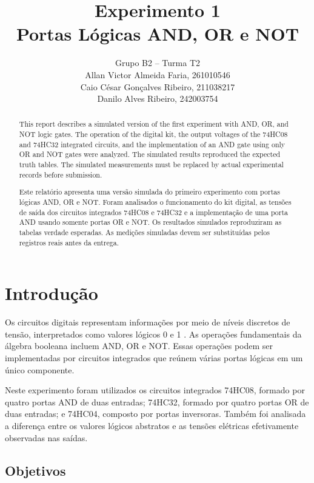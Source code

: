\documentclass[12pt]{article}
\title{Experimento 1\\
Portas Lógicas AND, OR e NOT}
\author{Grupo B2 -- Turma T2\\
        Allan Victor Almeida Faria, 261010546\\
        Caio César Gonçalves Ribeiro, 211038217\\
        Danilo Alves Ribeiro, 242003754}
\newenvironment{resumo}
        {\renewcommand{\abstractname}{Resumo}\begin{abstract}}
        {\end{abstract}}
\begin{document}
\maketitle

\renewcommand{\abstractname}{Abstract}
\begin{abstract}
This report describes a simulated version of the first experiment with AND,
OR, and NOT logic gates. The operation of the digital kit, the output voltages
of the 74HC08 and 74HC32 integrated circuits, and the implementation of an AND
gate using only OR and NOT gates were analyzed. The simulated results reproduced
the expected truth tables. The simulated measurements must be replaced by actual
experimental records before submission.
\end{abstract}

\begin{resumo}
Este relatório apresenta uma versão simulada do primeiro experimento com portas
lógicas AND, OR e NOT. Foram analisados o funcionamento do kit digital, as
tensões de saída dos circuitos integrados 74HC08 e 74HC32 e a implementação de
uma porta AND usando somente portas OR e NOT. Os resultados simulados reproduziram
as tabelas verdade esperadas. As medições simuladas devem ser substituídas pelos
registros reais antes da entrega.
\end{resumo}

\section{Introdução}
\label{sec:introducao}

Os circuitos digitais representam informações por meio de níveis discretos de
tensão, interpretados como valores lógicos 0 e 1 \cite{wakerly90}. As operações fundamentais da
álgebra booleana incluem AND, OR e NOT. Essas operações podem ser implementadas
por circuitos integrados que reúnem várias portas lógicas em um único componente.

Neste experimento foram utilizados os circuitos integrados 74HC08, formado por
quatro portas AND de duas entradas; 74HC32, formado por quatro portas OR de duas
entradas; e 74HC04, composto por portas inversoras. Também foi analisada a
diferença entre os valores lógicos abstratos e as tensões elétricas efetivamente
observadas nas saídas.

\subsection{Objetivos}
\label{sec:objetivos}
\end{document}
